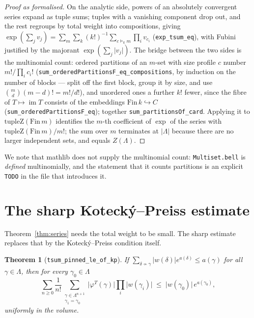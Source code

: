 \documentclass[11pt]{amsart}
\newtheorem{theorem}{Theorem}[section]
\begin{document}
\begin{proof}[Proof as formalised]
On the analytic side, powers of an absolutely convergent series expand
as tuple sums; tuples with a vanishing component drop out, and the rest
regroups by total weight into compositions, giving
$\exp(\sum_j v_j) = \sum_m \sum_{k} (k!)^{-1}
\sum_{c \vDash_k m} \prod_i v_{c_i}$ (\texttt{exp\_tsum\_eq}), with
Fubini justified by the majorant $\exp(\sum_j \lvert v_j\rvert)$. The
bridge between the two sides is the multinomial count: ordered
partitions of an $m$-set with size profile $c$ number $m!/\prod_i c_i!$
(\texttt{sum\_orderedPartitionsF\_eq\_compositions}, by induction on the
number of blocks — split off the first block, group it by size, and use
$\binom{m}{d}(m-d)! = m!/d!$), and unordered ones a further $k!$ fewer,
since the fibre of $T \mapsto \operatorname{im} T$ consists of the
embeddings $\mathrm{Fin}\,k \hookrightarrow C$
(\texttt{sum\_orderedPartitionsF\_eq}); together
\texttt{sum\_partitionsOf\_card}. Applying it to
$\mathrm{tupleZ}(\mathrm{Fin}\,m)$ identifies the $m$-th coefficient of
$\exp$ of the series with $\mathrm{tupleZ}(\mathrm{Fin}\,m)/m!$; the
sum over $m$ terminates at $\lvert \Lambda\rvert$ because there are no
larger independent sets, and equals $Z(\Lambda)$.
\end{proof}

We note that \textsf{mathlib} does not supply the multinomial count:
\texttt{Multiset.bell} is \emph{defined} multinomially, and the
statement that it counts partitions is an explicit \texttt{TODO} in the
file that introduces it.

\section{The sharp Kotecký--Preiss estimate}\label{sec:sharp}

Theorem~\ref{thm:series} needs the total weight to be small. The sharp
estimate replaces that by the Kotecký--Preiss condition itself.

\begin{theorem}[\texttt{tsum\_pinned\_le\_of\_kp}]\label{thm:sharp}
If $\sum_{\delta \nsim \gamma} \lvert w(\delta)\rvert e^{a(\delta)}
\le a(\gamma)$ for all $\gamma \in \Lambda$, then for every
$\gamma_0 \in \Lambda$
\[
  \sum_{n \ge 0} \frac{1}{n!}
  \sum_{\substack{\gamma \in \Lambda^{n+1} \\ \gamma_1 = \gamma_0}}
  \lvert \varphi^{T}(\gamma) \rvert \prod_i \lvert w(\gamma_i) \rvert
  \;\le\; \lvert w(\gamma_0) \rvert\, e^{a(\gamma_0)},
\]
uniformly in the volume.
\end{theorem}
\end{document}
